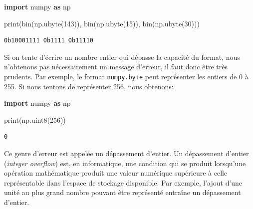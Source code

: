 \documentclass[
  letterpaper,
]{scrbook}
\newenvironment{Shaded}{\begin{snugshade}}{\end{snugshade}}
\newcommand{\BuiltInTok}[1]{\textcolor[rgb]{0.00,0.50,0.00}{#1}}
\newcommand{\DecValTok}[1]{\textcolor[rgb]{0.25,0.63,0.44}{#1}}
\newcommand{\ImportTok}[1]{\textcolor[rgb]{0.00,0.50,0.00}{\textbf{#1}}}
\newcommand{\NormalTok}[1]{\textcolor[rgb]{0.00,0.44,0.13}{#1}}
\theoremstyle{plain}
\theoremstyle{definition}
\theoremstyle{definition}
\theoremstyle{remark}
\begin{document}
\begin{Shaded}
\begin{Highlighting}[]
\ImportTok{import}\NormalTok{ numpy }\ImportTok{as}\NormalTok{ np}

\BuiltInTok{print}\NormalTok{(}\BuiltInTok{bin}\NormalTok{(np.ubyte(}\DecValTok{143}\NormalTok{)), }\BuiltInTok{bin}\NormalTok{(np.ubyte(}\DecValTok{15}\NormalTok{)), }\BuiltInTok{bin}\NormalTok{(np.ubyte(}\DecValTok{30}\NormalTok{)))}
\end{Highlighting}
\end{Shaded}

\begin{verbatim}
0b10001111 0b1111 0b11110
\end{verbatim}

\begin{tcolorbox}[enhanced jigsaw, colbacktitle=quarto-callout-caution-color!10!white, toptitle=1mm, left=2mm, toprule=.15mm, opacityback=0, bottomrule=.15mm, breakable, coltitle=black, title=\textcolor{quarto-callout-caution-color}{\faFire}\hspace{0.5em}{Soyez prudents!}, colframe=quarto-callout-caution-color-frame, arc=.35mm, titlerule=0mm, rightrule=.15mm, opacitybacktitle=0.6, leftrule=.75mm, bottomtitle=1mm, colback=white]

Si on tente d'écrire un nombre entier qui dépasse la capacité du format,
nous n'obtenons pas nécessairement un message d'erreur, il faut donc
être très prudents. Par exemple, le format \texttt{numpy.byte} peut
représenter les entiers de 0 à 255. Si nous tentons de représenter 256,
nous obtenons:

\begin{Shaded}
\begin{Highlighting}[]
\ImportTok{import}\NormalTok{ numpy }\ImportTok{as}\NormalTok{ np}

\BuiltInTok{print}\NormalTok{(np.uint8(}\DecValTok{256}\NormalTok{))}
\end{Highlighting}
\end{Shaded}

\begin{verbatim}
0
\end{verbatim}

\end{tcolorbox}

Ce genre d'erreur est appelée un dépassement d'entier. Un dépassement
d'entier (\emph{integer overflow}) est, en informatique, une condition
qui se produit lorsqu'une opération mathématique produit une valeur
numérique supérieure à celle représentable dans l'espace de stockage
disponible. Par exemple, l'ajout d'une unité au plus grand nombre
pouvant être représenté entraîne un dépassement d'entier.
\end{document}
